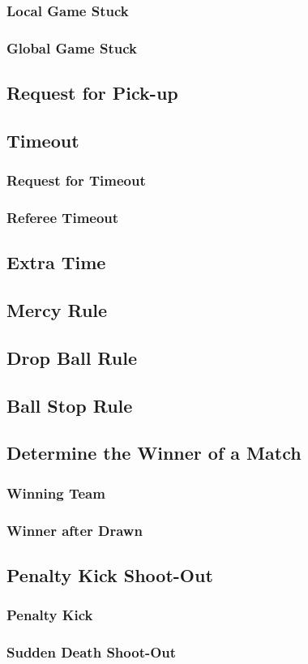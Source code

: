 \subsubsection{Local Game Stuck}
\subsubsection{Global Game Stuck}

\subsection{Request for Pick-up}

\subsection{Timeout}
\subsubsection{Request for Timeout}
\subsubsection{Referee Timeout}

\subsection{Extra Time}

\subsection{Mercy Rule}

\subsection{Drop Ball Rule}

\subsection{Ball Stop Rule}

\subsection{Determine the Winner of a Match}
\subsubsection{Winning Team}
\subsubsection{Winner after Drawn}

\subsection{Penalty Kick Shoot-Out}
\subsubsection{Penalty Kick}
\subsubsection{Sudden Death Shoot-Out}

